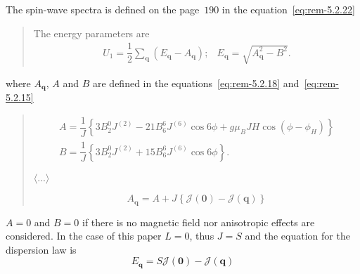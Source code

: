     The spin-wave spectra is defined on the page~$190$ in the equation~\eqref{eq:rem-5.2.22}
    \begin{quote}
        The energy parameters are
        \begin{equation}
            \begin{matrix}
                U_1 = \dfrac{1}{2}\sum_{\mathbf{q}}(E_{\mathbf{q}} - A_{\mathbf{q}}); & E_{\mathbf{q}} = \sqrt{A_{\mathbf{q}}^2 - B^2}.
            \end{matrix}
            \label{eq:rem-5.2.22} \tag{5.2.22}
        \end{equation}
    \end{quote}
    where $A_{\mathbf{q}}$, $A$ and $B$ are defined in the equations~\eqref{eq:rem-5.2.18} and~\eqref{eq:rem-5.2.15}
    \begin{quote}
        \begin{equation}
            \begin{matrix}
                A = \dfrac{1}{J}\left\{3B^0_2J^{(2)} - 21B^6_6J^{(6)}\cos6\phi + g\mu_BJH\cos(\phi - \phi_H)\right\}\\
                B = \dfrac{1}{J}\left\{3B^0_2J^{(2)} + 15B^6_6J^{(6)}\cos6\phi\right\}.
            \end{matrix}
            \label{eq:rem-5.2.15} \tag{5.2.15}
        \end{equation}

        $\langle ... \rangle$

        
        \begin{equation}
            A_{\mathbf{q}} = A + J\left\{\mathcal{J}(\mathbf{0}) - \mathcal{J}(\mathbf{q})\right\}
            \label{eq:rem-5.2.18} \tag{5.2.18}
        \end{equation}
    \end{quote}
    $A = 0$ and $B = 0$ if there is no magnetic field nor anisotropic effects are considered. In the case of this paper $L = 0$, thus $J = S$ and the equation for the dispersion law is
    \begin{equation}
        E_{\mathbf{q}} = S\mathcal{J}(\mathbf{0}) - \mathcal{J}(\mathbf{q})
    \end{equation}

